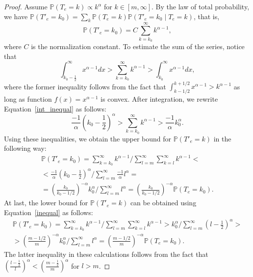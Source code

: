 \documentclass[sigconf]{acmart}
\renewcommand{\P}{\mathbb{P}}
\begin{document}
\begin{proof}
Assume $\P(T_e=k)\propto k^{\alpha}$ for $k\in [m,\infty]$. By the law of total probability, we have $\P(T'_e=k_0)= \sum_{k}\P(T_e=k)\P(T'_e=k_0\mid T_e=k)$, that is,
$$
\P(T'_e=k_0) = C \sum_{k=k_0}^{\infty} k^{\alpha-1},
$$
where $C$ is the normalization constant. To estimate the sum of the series, notice that
\begin{equation}\label{int_inequal}
\int_{k_0-\frac{1}{2}}^\infty x^{\alpha-1} dx > \sum_{k=k_0}^{\infty} k^{\alpha-1} > \int_{k_0}^\infty x^{\alpha-1} dx,    
\end{equation}
where the former inequality follows from the fact that $\int_{k-1/2}^{k+1/2} x^{\alpha-1}> k^{\alpha-1}$ as long as function $f(x)=x^{\alpha-1}$ is convex. After integration, we rewrite Equation~\ref{int_inequal} as follows:
\begin{equation}\label{inequal}
\frac{-1}{\alpha} \left ( k_0-\frac{1}{2}\right )^{\alpha} > \sum_{k=k_0}^{\infty} k^{\alpha-1} > \frac{-1}{\alpha} k_0^{\alpha}. \end{equation}
Using these inequalities, we obtain the upper bound for $\P(T'_e=k)%
$ in the following way:
\begin{multline*}
\P(T'_e=k_0) = \sum_{k=k_0}^{\infty} k^{\alpha-1} / \sum_{l=m}^\infty \sum_{k=l}^{\infty} k^{\alpha-1} < \\
< \frac{-1}{\alpha} \left ( k_0-\frac{1}{2}\right )^{\alpha} / \sum_{l=m}^\infty \frac{-1}{\alpha} l^{\alpha} = \\
=\left (\frac{k_0}{k_0-1/2}\right )^{-\alpha} k_0^\alpha/\sum_{l=m}^\infty l^{\alpha} = \left (\frac{k_0}{k_0-1/2}\right )^{-\alpha} \P(T_e=k_0).
\end{multline*}
At last, the lower bound for $\P(T'_e=k)%
$ can be obtained using Equation~\ref{inequal} as follows:
\begin{multline*}
\P(T'_e=k_0) = \sum_{k=k_0}^{\infty} k^{\alpha-1} / \sum_{l=m}^\infty \sum_{k=l}^{\infty} k^{\alpha-1} > k_0^{\alpha} / \sum_{l=m}^\infty  \left (l-\frac{1}{2}\right )^{\alpha} > \\
> \left (\frac{m-1/2}{m}\right )^{-\alpha} k_0^\alpha/\sum_{l=m}^\infty l^{\alpha} = \left (\frac{m-1/2}{m}\right )^{-\alpha} \P(T_e=k_0).
\end{multline*}
The latter inequality in these calculations follows from the fact that $\left (\frac{l-\frac{1}{2}}{l}\right )^{\alpha}<\left (\frac{m-\frac{1}{2}}{m}\right )^{\alpha}$ for $l>m$.

\end{proof}
\end{document}

